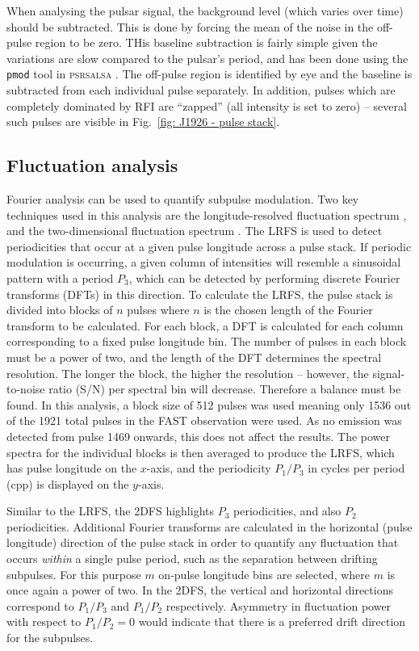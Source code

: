 When analysing the pulsar signal, the background level (which varies over time) should be subtracted. This is done by forcing the mean of the noise in the off-pulse region to be zero. THis baseline subtraction is fairly simple given the variations are slow compared to the pulsar's period, and has been done using the \texttt{pmod} tool in \textsc{psrsalsa} \citep{Wxxx2016}. The off-pulse region is identified by eye and the baseline is subtracted from each individual pulse separately. In addition, pulses which are completely dominated by RFI are ``zapped'' (all intensity is set to zero) -- several such pulses are visible in Fig.~\ref{fig: J1926 - pulse stack}.

\subsection{Fluctuation analysis}
\label{sec: J1926 - analysis - single pulse variability}


Fourier analysis can be used to quantify subpulse modulation. Two key techniques used in this analysis are the longitude-resolved fluctuation spectrum \citep[LRFS;][]{Bxxx1970a}, and the two-dimensional fluctuation spectrum \citep[2DFS;][]{ESxx2002}. The LRFS is used to detect periodicities that occur at a given pulse longitude across a pulse stack. If periodic modulation is occurring, a given column of intensities will resemble a sinusoidal pattern with a period $P_3$, which can be detected by performing discrete Fourier transforms (DFTs) in this direction. To calculate the LRFS, the pulse stack is divided into blocks of $n$ pulses where $n$ is the chosen length of the Fourier transform to be calculated. For each block, a DFT is calculated for each column corresponding to a fixed pulse longitude bin. The number of pulses in each block must be a power of two, and the length of the DFT determines the spectral resolution. The longer the block, the higher the resolution -- however, the signal-to-noise ratio (S/N) per spectral bin will decrease. Therefore a balance must be found. In this analysis, a block size of 512 pulses was used meaning only 1536 out of the 1921 total pulses in the FAST observation were used. As no emission was detected from pulse 1469 onwards, this does not affect the results. The power spectra for the individual blocks is then averaged to produce the LRFS, which has pulse longitude on the $x$-axis, and the periodicity $P_1/P_3$ in cycles per period (cpp) is displayed on the $y$-axis. 

Similar to the LRFS, the 2DFS highlights $P_3$ periodicities, and also $P_2$ periodicities. Additional Fourier transforms are calculated in the horizontal (pulse longitude) direction of the pulse stack in order to quantify any fluctuation that occurs \textit{within} a single pulse period, such as the separation between drifting subpulses. For this purpose $m$ on-pulse longitude bins are selected, where $m$ is once again a power of two. In the 2DFS, the vertical and horizontal directions correspond to $P_1/P_3$ and $P_1/P_2$ respectively. Asymmetry in fluctuation power with respect to $P_1/P_2 = 0$ would indicate that there is a preferred drift direction for the subpulses.


